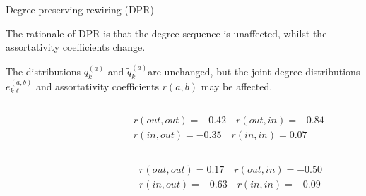 \documentclass[xcolor=dvipsnames, compress, 10pt]{beamer}
\theoremstyle{remark}
\begin{document}

\begin{frame}{Degree-preserving rewiring (DPR)}

The rationale of DPR is that the degree sequence is unaffected, whilst the
assortativity coefficients change. 

\vspace{0.1cm}

The distributions $q_{k}^{(a)}$ and 
$\tilde q_{k}^{(a)}$are unchanged, but the joint degree distributions
$e_{k\ell}^{(a, b)}$ and assortativity 
coefficients $r(a, b)$ may be affected.

\vspace{0.1cm}

\begin{columns}
	\begin{column}{0.4\textwidth}
		\hfill
		\scalebox{0.6}{}
	\end{column}
	\begin{column}{0.6\textwidth}
		\begin{align*}
			&r(out, out) = -0.42 \quad r(out, in) = -0.84\\
			&r(in, out) = -0.35 \quad r(in, in) = 0.07
		\end{align*}
	\end{column}
\end{columns}

\vspace{0.2cm}

\begin{columns}
	\begin{column}{0.4\textwidth}
		\hfill
		\scalebox{0.6}{}
	\end{column}
	\begin{column}{0.6\textwidth}
		\begin{align*}
			&r(out, out) = 0.17 \quad r(out, in) = -0.50\\
			&r(in, out) = -0.63 \quad r(in, in) = -0.09
		\end{align*}
	\end{column}
\end{columns}


\end{frame}

\end{document}
